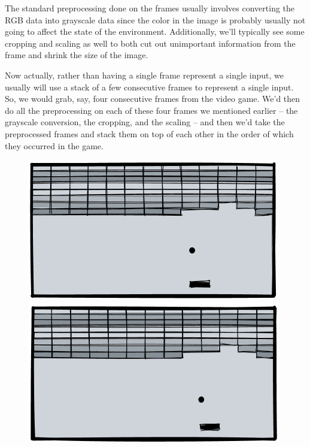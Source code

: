 The standard preprocessing done on the frames usually involves converting the RGB data 
into grayscale data since the color in the image is probably usually not going to affect 
the state of the environment. Additionally, we'll typically see some cropping and scaling 
as well to both cut out unimportant information from the frame and shrink the size of 
the image.

Now actually, rather than having a single frame represent a single input, we usually 
will use a stack of a few consecutive frames to represent a single input. So, we would 
grab, say, four consecutive frames from the video game. We'd then do all the preprocessing 
on each of these four frames we mentioned earlier – the grayscale conversion, the 
cropping, and the scaling – and then we'd take the preprocessed frames and stack them on 
top of each other in the order of which they occurred in the game.

\begin{figure}[h]
\centering
\begin{minipage}{0.49\linewidth}
  \centering
  \includegraphics[width=0.618\linewidth]{pix/q_learning/game_1.png}
\end{minipage}%
\begin{minipage}{0.49\linewidth}
  \centering
  \includegraphics[width=0.618\linewidth]{pix/q_learning/game_2.png}
\end{minipage}
\end{figure}


